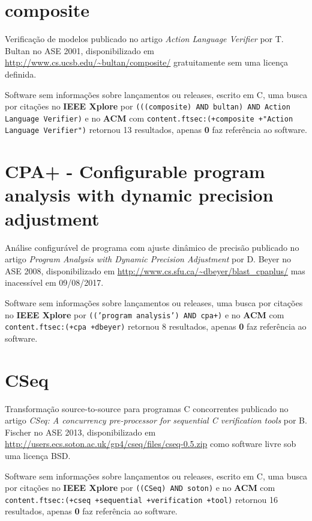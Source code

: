 \section{composite}

Verificação de modelos
publicado no artigo {\it Action Language Verifier}
por T. Bultan
no ASE 2001,
disponibilizado em \url{http://www.cs.ucsb.edu/~bultan/composite/}
gratuitamente
sem uma licença definida.

Software sem informações sobre lançamentos ou releases,
escrito em C,
uma busca por citações no {\bf IEEE Xplore} por
\texttt{(((composite) AND bultan) AND Action Language Verifier)}
e no {\bf ACM} com
\texttt{content.ftsec:(+composite +"Action Language Verifier")}
retornou
13 resultados, apenas
{\bf 0} faz referência ao software.



\section{CPA+ - Configurable program analysis with dynamic precision adjustment}

Análise configurável de programa com ajuste dinâmico de precisão
publicado no artigo {\it Program Analysis with Dynamic Precision Adjustment}
por D. Beyer
no ASE 2008,
disponibilizado em \url{http://www.cs.sfu.ca/~dbeyer/blast_cpaplus/}
mas inacessível em 09/08/2017.

Software sem informações sobre lançamentos ou releases,
uma busca por citações no {\bf IEEE Xplore} por
\texttt{(('program analysis') AND cpa+)}
e no {\bf ACM} com
\texttt{content.ftsec:(+cpa +dbeyer)}
retornou
8 resultados, apenas
{\bf 0} faz referência ao software.



\section{CSeq}

Transformação source-to-source para programas C concorrentes
publicado no artigo {\it CSeq: A concurrency pre-processor for sequential C verification tools}
por B. Fischer
no ASE 2013,
disponibilizado em \url{http://users.ecs.soton.ac.uk/gp4/cseq/files/cseq-0.5.zip}
como software livre
sob uma licença BSD.

Software sem informações sobre lançamentos ou releases,
escrito em C,
uma busca por citações no {\bf IEEE Xplore} por
\texttt{((CSeq) AND soton)}
e no {\bf ACM} com
\texttt{content.ftsec:(+cseq +sequential +verification +tool)}
retornou
16 resultados, apenas
{\bf 0} faz referência ao software.



